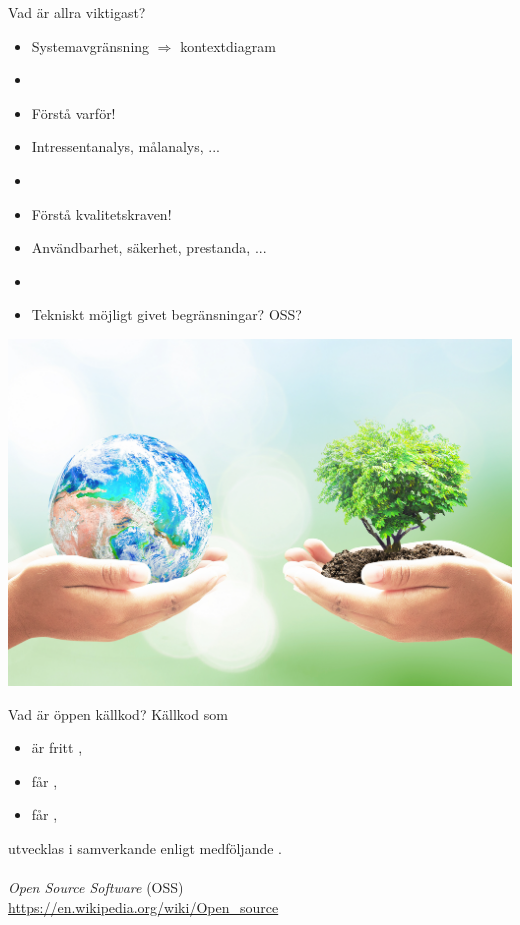\documentclass{simpleslides}
\begin{document}
\begin{Slide}{Vad är allra viktigast?}
  \begin{itemize}\fontsize{14}{16}\selectfont
    \item Systemavgränsning \hfill $\Rightarrow$ kontextdiagram
    \item []
    \item Förstå varför! 
    \item[] Intressentanalys, målanalys, ...
    \item[] 
    \item Förstå kvalitetskraven!
    \item[] Användbarhet, säkerhet, prestanda, ...
    \item[] 
    \item Tekniskt möjligt givet begränsningar? \hfill OSS? 
  \end{itemize}
\end{Slide}



{  
\begin{Slide}{}
  \vspace*{-1.0cm}\hspace*{-0.75cm}\includegraphics[width=1.2\textwidth]{img/earth-tree.jpg}

 {\fontsize{13}{13}\selectfont {}}
\end{Slide}
}

\begin{Slide}{Vad är öppen källkod?}
Källkod som 
  \begin{itemize}
    \item är fritt ,
    \item får ,
    \item får ,
  \end{itemize}
  utvecklas i samverkande  enligt medföljande . \\~\\
{\small \emph{Open Source Software} (OSS) \\ \href{https://en.wikipedia.org/wiki/Open_source}{https://en.wikipedia.org/wiki/Open\_source}}
\end{Slide}
\end{document}
